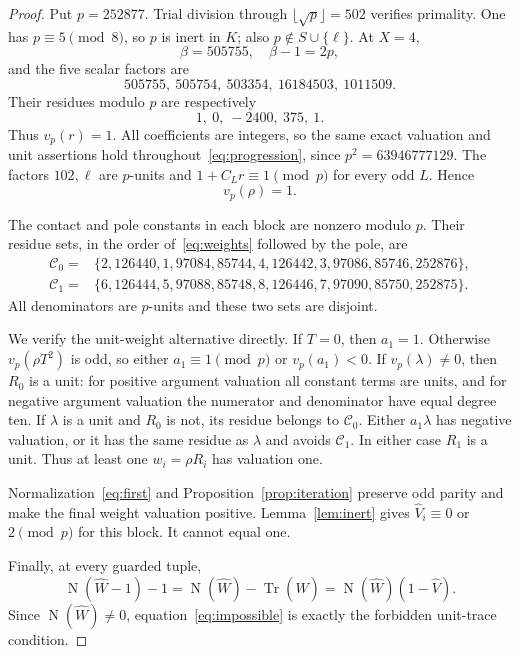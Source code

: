 \documentclass[11pt,a4paper]{article}
\DeclareMathOperator{\Tr}{Tr}\DeclareMathOperator{\Nm}{N}
\begin{document}
\begin{proof}
Put $p=252877$. Trial division through $\lfloor\sqrt p\rfloor=502$
verifies primality. One has $p\equiv5\pmod8$, so $p$ is inert in $K$;
also $p\notin S\cup\{\ell\}$. At $X=4$,
\[
 \beta=505755,\quad \beta-1=2p,
\]
and the five scalar factors are
\[
                505755,\ 505754,\ 503354,\ 16184503,\ 1011509.
\]
Their residues modulo $p$ are respectively
\[
                         1,\ 0,\ -2400,\ 375,\ 1.
\]
Thus $v_p(r)=1$. All coefficients are integers, so the same exact
valuation and unit assertions hold throughout~\eqref{eq:progression},
since $p^2=63946777129$. The factors $102,\ell$ are $p$-units and
$1+C_Lr\equiv1\pmod p$ for every odd $L$. Hence
\begin{equation}\label{eq:rhov}
                              v_p(\rho)=1.
\end{equation}

The contact and pole constants in each block are nonzero modulo $p$.
Their residue sets, in the order of~\eqref{eq:weights} followed by the
pole, are
\begin{align*}
\mathcal C_0={}&\{2,126440,1,97084,85744,4,126442,3,97086,85746,252876\},\\
\mathcal C_1={}&\{6,126444,5,97088,85748,8,126446,7,97090,85750,252875\}.
\end{align*}
All denominators are $p$-units and these two sets are disjoint.

We verify the unit-weight alternative directly. If $T=0$, then
$a_1=1$. Otherwise $v_p(\rho T^2)$ is odd, so either
$a_1\equiv1\pmod p$ or $v_p(a_1)<0$. If $v_p(\lambda)\ne0$,
then $R_0$ is a unit: for positive argument valuation all constant
terms are units, and for negative argument valuation the numerator
and denominator have equal degree ten. If $\lambda$ is a unit
and $R_0$ is not, its residue belongs to $\mathcal C_0$. Either
$a_1\lambda$ has negative valuation, or it has the same residue as
$\lambda$ and avoids $\mathcal C_1$. In either case $R_1$ is a unit.
Thus at least one $w_i=\rho R_i$ has valuation one.

Normalization~\eqref{eq:first} and Proposition~\ref{prop:iteration}
preserve odd parity and make the final weight valuation positive.
Lemma~\ref{lem:inert} gives $\widehat V_i\equiv0$ or $2\pmod p$
for this block. It cannot equal one.

Finally, at every guarded tuple,
\[
 \Nm(\widehat W-1)-1
      =\Nm(\widehat W)-\Tr(\widehat W)
      =\Nm(\widehat W)(1-\widehat V).
\]
Since $\Nm(\widehat W)\ne0$, equation~\eqref{eq:impossible} is
exactly the forbidden unit-trace condition.
\end{proof}
\end{document}
